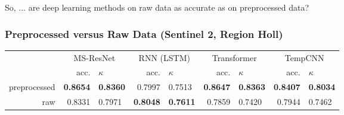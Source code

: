 
{
	\begin{frame}[plain]
	\vfill
	\begin{center}
		\Huge\color{tumwhite}
		So, ... are deep learning methods on raw data as accurate as on preprocessed data?
	\end{center}
	\vfill
\end{frame}
}

\begin{frame}
	\frametitle{Preprocessed versus Raw Data (Sentinel 2, Region Holl)}
	
	\begin{tabular}{rrlrlrlrl}
		\toprule
		 & \multicolumn{2}{c}{MS-ResNet} & \multicolumn{2}{c}{RNN (LSTM)} & \multicolumn{2}{c}{Transformer} & \multicolumn{2}{c}{TempCNN} \\
		 & acc. & $\kappa$ & acc. & $\kappa$ & acc. & $\kappa$ & acc. & $\kappa$ \\
		\cmidrule(lr){2-3}\cmidrule(lr){4-5} \cmidrule(lr){6-7}\cmidrule(lr){8-9}
		preprocessed & \textbf{0.8654} & \textbf{0.8360} & 0.7997 & 0.7513 & \textbf{0.8647} & \textbf{0.8363} & \textbf{0.8407} & \textbf{0.8034} \\
		raw 		 & 0.8331 & 0.7971 & \textbf{0.8048} & \textbf{0.7611} & 0.7859 & 0.7420 & 0.7944 & 0.7462 \\
		\bottomrule
	\end{tabular}
	
	
\end{frame}


